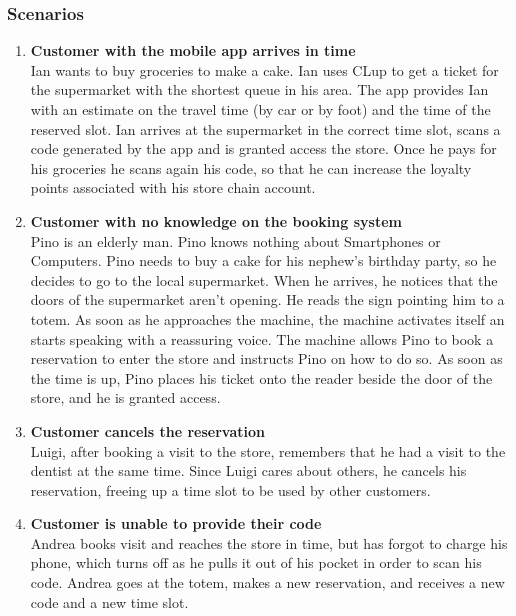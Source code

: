 \subsubsection{Scenarios}
    \begin{enumerate}[label=\Alph*.]
        \item \textbf{Customer with the mobile app arrives in time}\\
            Ian wants to buy groceries to make a cake. Ian uses CLup to get a ticket for the supermarket with the shortest queue in his area.
            The app provides Ian with an estimate on the travel time (by car or by foot) and the time of the reserved slot. 
            Ian arrives at the supermarket in the correct time slot, scans a code generated by the app and is granted access 
            the store. Once he pays for his groceries he scans again his code, so that he can increase the loyalty points associated with his store chain account.

        \item \textbf{Customer with no knowledge on the booking system}\\
            Pino is an elderly man. Pino knows nothing about Smartphones or Computers. Pino needs to buy a cake for his
            nephew's birthday party, so he decides to go to the local supermarket. When he arrives, he notices that the doors of the supermarket
            aren't opening. He reads the sign pointing him to a totem. 
            As soon as he approaches the machine, the machine activates itself an starts speaking with a reassuring voice. 
            The machine allows Pino to book a reservation to enter the store and instructs Pino on how to do so. 
            As soon as the time is up, Pino places his ticket onto the reader beside the door of the store, and he is granted access. 

        \item \textbf{Customer cancels the reservation}\\
            Luigi, after booking a visit to the store, remembers that he had a visit to the dentist at the same time.
            Since Luigi cares about others, he cancels his reservation, freeing up a time slot to be used by other customers.

        \item \textbf{Customer is unable to provide their code}\\
            Andrea books visit and reaches the store in time, but has forgot to charge his phone, which turns off as he pulls it out of his pocket in order to scan his code.
            Andrea goes at the totem, makes a new reservation, and receives a new code and a new time slot.
    \end{enumerate}


